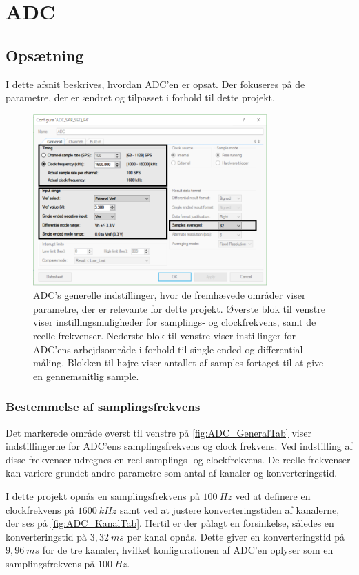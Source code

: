 \chapter{ADC} \label{sec:ADC_bilag}
\section{Opsætning}
I dette afsnit beskrives, hvordan ADC'en er opsat. Der fokuseres på de parametre, der er ændret og tilpasset i forhold til dette projekt.

\begin{figure}[H]
	\centering
	\includegraphics[width=0.8\textwidth]{figures/ADC_instillinger_edit.png}
	\caption{ADC's generelle indstillinger, hvor de fremhævede områder viser parametre, der er relevante for dette projekt. Øverste blok til venstre viser instillingsmuligheder for samplings- og clockfrekvens, samt de reelle frekvenser. Nederste blok til venstre viser instillinger for ADC'ens arbejdsområde i forhold til single ended og differential måling. Blokken til højre viser antallet af samples fortaget til at give en gennemsnitlig sample.}
	\label{fig:ADC_GeneralTab}
\end{figure}

\subsection{Bestemmelse af samplingsfrekvens}
Det markerede område øverst til venstre på \autoref{fig:ADC_GeneralTab} viser indstillingerne for ADC'ens samplingsfrekvens og clock frekvens. Ved indstilling af disse frekvenser udregnes en reel samplings- og clockfrekvens. De reelle frekvenser kan variere grundet andre parametre som antal af kanaler og konverteringstid.

I dette projekt opnås en samplingsfrekvens på $100~Hz$ ved at definere en clockfrekvens på $1600~kHz$ samt ved at justere konverteringstiden af kanalerne, der ses på \autoref{fig:ADC_KanalTab}. Hertil er der pålagt en forsinkelse, således en konverteringstid på $3,32~ms$ per kanal opnås. Dette giver en konverteringstid på $9,96~ms$ for de tre kanaler, hvilket konfigurationen af ADC'en oplyser som en samplingsfrekvens på $100~Hz$. 

